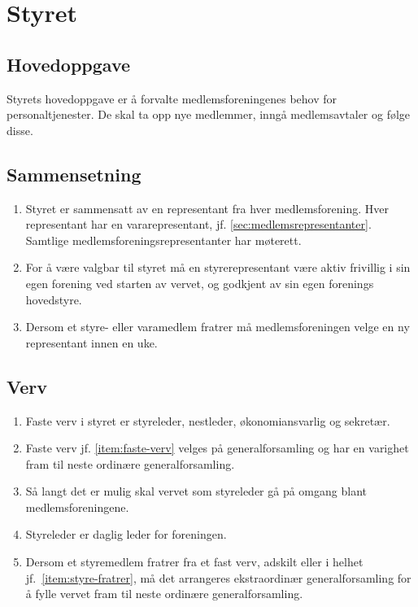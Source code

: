 \documentclass[11pt,norsk,a4paper]{article}
\renewcommand{\thesection}{§ \arabic{section}}
\renewcommand{\thesubsection}{\thesection-\arabic{subsection}}
\renewcommand{\theenumi}{\alph{enumi}}
\begin{document}
\section{Styret}
\subsection{Hovedoppgave}
Styrets hovedoppgave er å forvalte medlemsforeningenes behov for personaltjenester.
De skal ta opp nye medlemmer, inngå medlemsavtaler og følge disse.

\subsection{Sammensetning\label{sec:sammensetning}}
\begin{enumerate}[ref=\thesubsection~punkt \theenumi]
	\item Styret er sammensatt av en representant fra hver medlemsforening. Hver representant har en vararepresentant, jf. \ref{sec:medlemsrepresentanter}. Samtlige medlemsforeningsrepresentanter har møterett.
	\item For å være valgbar til styret må en styrerepresentant være aktiv frivillig i sin egen forening ved starten av vervet, og godkjent av sin egen forenings hovedstyre\label{item:valgbar}.
	\item Dersom et styre- eller varamedlem fratrer må medlemsforeningen velge en ny representant innen en uke\label{item:styre-fratrer}.
\end{enumerate}

\subsection{Verv}
\begin{enumerate}
	\item Faste verv i styret er styreleder, nestleder, økonomiansvarlig og sekretær\label{item:faste-verv}. 
	\item Faste verv jf. \cref{item:faste-verv} velges på generalforsamling og har en varighet fram til neste ordinære generalforsamling.
	\item Så langt det er mulig skal vervet som styreleder gå på omgang blant medlemsforeningene. 
	\item Styreleder er daglig leder for foreningen.
	\item Dersom et styremedlem fratrer fra et fast verv, adskilt eller i helhet jf.~\ref{item:styre-fratrer}, må det arrangeres ekstraordinær generalforsamling for å fylle vervet fram til neste ordinære generalforsamling.
\end{enumerate}
\end{document}
